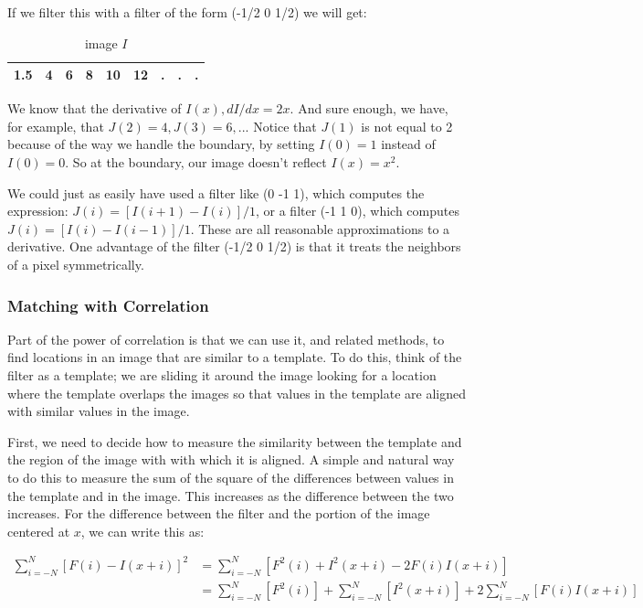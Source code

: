 \documentclass{report}
\begin{document}
If we filter this with a filter of the form (-1/2 0 1/2) we will get:
\begin{table}[ht]
\centering
\label{my-label-4}
\begin{tabular}{|l|l|l|l|l|l|l|l|l|}
\hline
1.5 & 4 & 6 & 8 & 10 & 12 & . & . & . \\ \hline
\end{tabular}
\caption{image $I$}
\end{table}

We know that the derivative of $I(x), dI/dx = 2x$. And sure enough, we have, for example, that $J(2)=4, J(3)=6, ...$ Notice that $J(1)$ is not equal to 2 because of the way we handle the boundary, by setting $I(0) = 1$ instead of $I(0) = 0$. So at the boundary, our image doesn't reflect $I(x) = x^2$.

We could just as easily have used a filter like (0 -1 1), which computes the expression: $J(i) = [I(i+1)-I(i)]/1$, or a filter (-1 1 0), which computes $J(i) = [I(i)-I(i-1)]/1$. These are all reasonable approximations to a derivative. One advantage of the filter (-1/2 0 1/2) is that it treats the neighbors of a pixel symmetrically.

\subsubsection{Matching with Correlation}
Part of the power of correlation is that we can use it, and related methods, to find locations in an image that are similar to a template. To do this, think of the filter as a template; we are sliding it around the image looking for a location where the template overlaps the images so that values in the template are aligned with similar values in the image.

First, we need to decide how to measure the similarity between the template and the region of the image with with which it is aligned. A simple and natural way to do this to measure the sum of the square of the differences between values in the template and in the image. This increases as the difference between the two increases. For the difference between the filter and the portion of the image centered at $x$, we can write this as:

$\begin{aligned}
    \sum_{i=-N}^{N}[F(i)-I(x+i)]^2 &= \sum_{i=-N}^{N}[F^2(i)+I^2(x+i)-2F(i)I(x+i)] \\
    &= \sum_{i=-N}^{N}[F^2(i)] + \sum_{i=-N}^{N}[I^2(x+i)] + 2\sum_{i=-N}^{N}[F(i)I(x+i)]
\end{aligned}$
\end{document}
